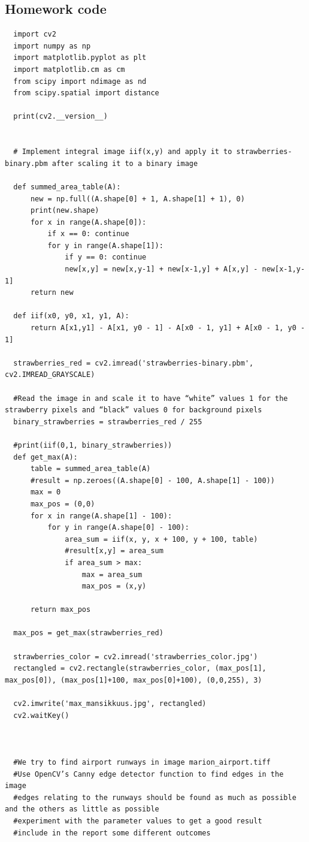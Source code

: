 \documentclass{article}
\begin{document}
\subsection{Homework code}
\begin{verbatim}
  import cv2
  import numpy as np
  import matplotlib.pyplot as plt
  import matplotlib.cm as cm
  from scipy import ndimage as nd
  from scipy.spatial import distance

  print(cv2.__version__)


  # Implement integral image iif(x,y) and apply it to strawberries-binary.pbm after scaling it to a binary image

  def summed_area_table(A):
      new = np.full((A.shape[0] + 1, A.shape[1] + 1), 0)
      print(new.shape)
      for x in range(A.shape[0]):
          if x == 0: continue
          for y in range(A.shape[1]):
              if y == 0: continue
              new[x,y] = new[x,y-1] + new[x-1,y] + A[x,y] - new[x-1,y-1]
      return new

  def iif(x0, y0, x1, y1, A):
      return A[x1,y1] - A[x1, y0 - 1] - A[x0 - 1, y1] + A[x0 - 1, y0 - 1]

  strawberries_red = cv2.imread('strawberries-binary.pbm', cv2.IMREAD_GRAYSCALE)

  #Read the image in and scale it to have “white” values 1 for the strawberry pixels and “black” values 0 for background pixels
  binary_strawberries = strawberries_red / 255

  #print(iif(0,1, binary_strawberries))
  def get_max(A):
      table = summed_area_table(A)
      #result = np.zeroes((A.shape[0] - 100, A.shape[1] - 100))
      max = 0
      max_pos = (0,0)
      for x in range(A.shape[1] - 100):
          for y in range(A.shape[0] - 100):
              area_sum = iif(x, y, x + 100, y + 100, table)
              #result[x,y] = area_sum
              if area_sum > max:
                  max = area_sum
                  max_pos = (x,y)
      
      return max_pos

  max_pos = get_max(strawberries_red)

  strawberries_color = cv2.imread('strawberries_color.jpg')
  rectangled = cv2.rectangle(strawberries_color, (max_pos[1], max_pos[0]), (max_pos[1]+100, max_pos[0]+100), (0,0,255), 3)

  cv2.imwrite('max_mansikkuus.jpg', rectangled)
  cv2.waitKey()



  #We try to find airport runways in image marion_airport.tiff
  #Use OpenCV’s Canny edge detector function to find edges in the image
  #edges relating to the runways should be found as much as possible and the others as little as possible
  #experiment with the parameter values to get a good result
  #include in the report some different outcomes


\end{verbatim}
\end{document}
